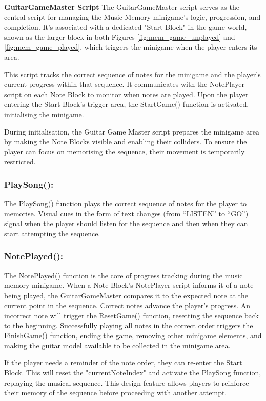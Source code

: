 \documentclass{l4proj}
\begin{document}
\textbf{GuitarGameMaster Script} \newline
The GuitarGameMaster script serves as the central script for managing the Music Memory minigame's logic, progression, and completion. It's associated with a dedicated "Start Block" in the game world, shown as the larger block in both Figures \ref{fig:mem_game_unplayed} and  \ref{fig:mem_game_played}, which triggers the minigame when the player enters its area.

This script tracks the correct sequence of notes for the minigame and the player's current progress within that sequence. It communicates with the NotePlayer script on each Note Block to monitor when notes are played. Upon the player entering the Start Block's trigger area, the StartGame() function is activated, initialising the minigame.

During initialisation, the Guitar Game Master script prepares the minigame area by making the Note Blocks visible and enabling their colliders. To ensure the player can focus on memorising the sequence, their movement is temporarily restricted. 

\subsubsection{PlaySong():} The PlaySong() function plays the correct sequence of notes for the player to memorise. Visual cues in the form of text changes (from “LISTEN” to “GO”) signal when the player should listen for the sequence and then when they can start attempting the sequence.

\subsubsection{NotePlayed():} The NotePlayed() function is the core of progress tracking during the music memory minigame. When a Note Block's NotePlayer script informs it of a note being played, the GuitarGameMaster compares it to the expected note at the current point in the sequence. Correct notes advance the player's progress. An incorrect note will trigger the ResetGame() function, resetting the sequence back to the beginning. Successfully playing all notes in the correct order triggers the FinishGame() function, ending the game, removing other minigame elements, and making the guitar model available to be collected in the minigame area.

If the player needs a reminder of the note order, they can re-enter the Start Block. This will reset the "currentNoteIndex" and activate the PlaySong function, replaying the musical sequence. This design feature allows players to reinforce their memory of the sequence before proceeding with another attempt.
\end{document}
